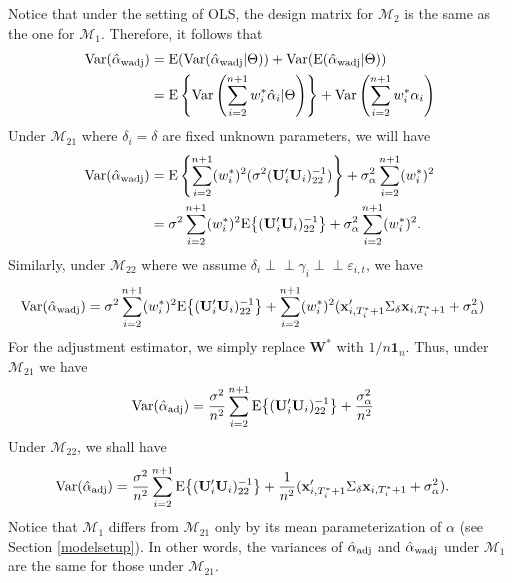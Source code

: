 \documentclass[11pt]{article}
\def\mbf#1{\mathbf{#1}} %
\newcommand{\indep}{\perp \!\!\! \perp } %
\def\mrm#1{\mathrm{#1}} %
\def\mc#1{\mathcal{#1}} %
\def\E#1{\mathrm{E}(#1)} %
\def\var#1{\mathrm{Var}(#1)} %
\theoremstyle{definition}
\begin{document}
Notice that under the setting of OLS, the design matrix for $\mc{M}_2$ is the same as the one for $\mc{M}_1$. Therefore, it follows that
  \begin{align*}
  \var{\hat{\alpha}_{\rm wadj}} 
  &= \E{\var{\hat{\alpha}_{\rm wadj}|\Theta}} + \var{\E{\hat{\alpha}_{\rm wadj}|\Theta}} \\
  &=\mrm{E} \left\{\mrm{Var}\left(\sum_{i=2}^{n+1} w_i^*\hat{\alpha}_i|\Theta\right)\right\} +\mrm{Var}\left(\sum_{i=2}^{n+1} w_i^*\alpha_i\right) 
\end{align*}
Under $\mc{M}_{21}$ where $\delta_i=\delta$ are fixed unknown parameters,  we will have
  \begin{align}
  \var{\hat{\alpha}_{\rm wadj}} 
  &= \mrm{E} \left\{\sum_{i=2}^{n+1}(w_i^*)^2(\sigma^2(\mbf{U}'_i\mbf{U}_i)^{-1}_{22})\right\} +\sigma^2_{\alpha}\sum_{i=2}^{n+1}(w_i^*)^2  \nonumber\\
  &= \sigma^2\sum_{i=2}^{n+1}(w_i^*)^2\mrm{E}\big\{(\mbf{U}'_i\mbf{U}_i)^{-1}_{22}\big\}+\sigma^2_{\alpha}\sum_{i=2}^{n+1}(w_i^*)^2.\label{equation6}
\end{align}
Similarly, under $\mc{M}_{22}$ where we assume $\delta_i \indep \gamma_i \indep \varepsilon_{i,t}$, we have
 \begin{align*}
  \var{\hat{\alpha}_{\rm wadj}} 
  &= \sigma^2\sum_{i=2}^{n+1}(w_i^*)^2\mrm{E}\big\{(\mbf{U}'_i\mbf{U}_i)^{-1}_{22}\big\}
  + \sum_{i=2}^{n+1} (w_i^*)^2 (\mbf{x}_{i, T_i^*+1}'\Sigma_{\delta}\mbf{x}_{i, T_i^*+1} + \sigma^2_{\alpha})
\end{align*}
For the adjustment estimator, we simply replace $\mbf{W}^*$ with $1/n\mbf{1}_n$. Thus, under $\mc{M}_{21}$ we have 
 \begin{align*}
  \var{\hat{\alpha}_{\rm adj}} 
  &=\frac{\sigma^2}{n^2}\sum_{i=2}^{n+1}\mrm{E}\big\{(\mbf{U}'_i\mbf{U}_i)^{-1}_{22}\big\}+\frac{\sigma^2_{\alpha}}{n^2}
\end{align*}
Under $\mc{M}_{22}$, we shall have
 \begin{align*}
  \var{\hat{\alpha}_{\rm adj}} 
  &=\frac{\sigma^2}{n^2}\sum_{i=2}^{n+1}\mrm{E}\big\{(\mbf{U}'_i\mbf{U}_i)^{-1}_{22}\big\}+\frac{1}{n^2}(\mbf{x}_{i, T_i^*+1}'\Sigma_{\delta}\mbf{x}_{i, T_i^*+1} + \sigma^2_{\alpha}).
\end{align*}
Notice that $\mc{M}_{1}$ differs from $\mc{M}_{21}$ only by its mean parameterization of $\alpha$ (see Section \ref{modelsetup}). In other words, the variances of $\hat{\alpha}_{\rm adj}$ and $\hat{\alpha}_{\rm wadj}$ under $\mc{M}_1$ are the same for those under $\mc{M}_{21}$.
\end{document}
